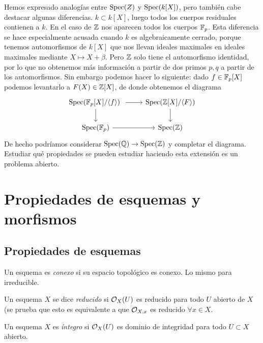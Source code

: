\documentclass[GA.tex]{subfiles}
\begin{document}
\begin{nota}
Hemos expresado analogías entre $\operatorname{Spec}(Z)$ y $\operatorname{Spec}(k[X])$, pero también cabe destacar algunas diferencias. $k\subset k[X]$, luego todos los cuerpos residuales contienen a $k$. En el caso de $\mathbb{Z}$ nos aparecen todos los cuerpos $\mathbb{F}_p$. Esta diferencia se hace especialmente acusada cuando $k$ es algebraicamente cerrado, porque tenemos automorfismos de $k[X]$ que nos llevan ideales maximales en ideales maximales mediante $X\mapsto X+\beta$. Pero $\mathbb{Z}$ solo tiene el automorfismo identidad, por lo que no obtenemos más información a partir de dos primos $p,q$ a partir de los automorfismos. Sin embargo podemos hacer lo siguiente: dado $f\in\mathbb{F}_p[X]$ podemos levantarlo a $F(X)\in\mathbb{Z}[X]$, de donde obtenemos el diagrama
\[
\begin{tikzcd}
\spec(\F_p[X]/\gene{f})\arrow[r]\arrow[d]\ &\spec(\Z[X]/\gene{F})\arrow[d]\\
\spec(\F_p)\arrow[r] & \spec(\Z)
\end{tikzcd}
\]
De hecho podríamos considerar $\operatorname{Spec}(\mathbb{Q})\to\operatorname{Spec}(\mathbb{Z})$ y completar el diagrama. Estudiar qué propiedades se pueden estudiar haciendo esta extensión es un problema abierto. 
\end{nota}

\section{Propiedades de esquemas y morfismos}

\subsection{Propiedades de esquemas}

\begin{defi}
Un esquema es \emph{conexo} si su espacio topológico es conexo. Lo mismo para irreducible. 
\end{defi}

\begin{defi}
Un esquema $X$ se dice \emph{reducido} si ${\mathcal O}_X(U)$ es reducido para todo $U$ abierto de $X$ (se prueba que esto es equivalente a que ${\mathcal O}_{X,x}$ es reducido $\forall x\in X$. 
\end{defi}

\begin{defi}
Un esquema $X$ es \emph{íntegro} si ${\mathcal O}_X(U)$ es dominio de integridad para todo $U\subset X$ abierto.
\end{defi}
\end{document}
